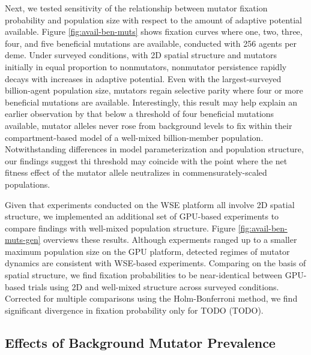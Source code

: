 Next, we tested sensitivity of the relationship between mutator fixation probability and population size with respect to the amount of adaptive potential available.
Figure \ref{fig:avail-ben-muts} shows fixation curves where one, two, three, four, and five beneficial mutations are available, conducted with 256 agents per deme.
Under surveyed conditions, with 2D spatial structure and mutators initially in equal proportion to nonmutators, nonmutator persistence rapidly decays with increases in adaptive potential.
Even with the largest-surveyed billion-agent population size, mutators regain selective parity where four or more beneficial mutations are available.
Interestingly, this result may help explain an earlier observation by \citet{tenaillon1999mutators} that below a threshold of four beneficial mutations available, mutator alleles never rose from background levels to fix within their compartment-based model of a well-mixed billion-member population.
Notwithstanding differences in model parameterization and population structure, our findings suggest thi threshold may coincide with the point where the net fitness effect of the mutator allele neutralizes in commensurately-scaled populations.



Given that experiments conducted on the WSE platform all involve 2D spatial structure, we implemented an additional set of GPU-based experiments to compare findings with well-mixed population structure.
Figure \ref{fig:avail-ben-muts-gen} overviews these results.
Although experments ranged up to a smaller maximum population size on the GPU platform, detected regimes of mutator dynamics are consistent with WSE-based experiments.
Comparing on the basis of spatial structure, we find fixation probabilities to be near-identical between GPU-based trials using 2D and well-mixed structure across surveyed conditions.
Corrected for multiple comparisons using the Holm-Bonferroni method, we find significant divergence in fixation probability only for TODO (TODO).

\subsection{Effects of Background Mutator Prevalence}
\label{sec:background-hypermutator-prevalence}



